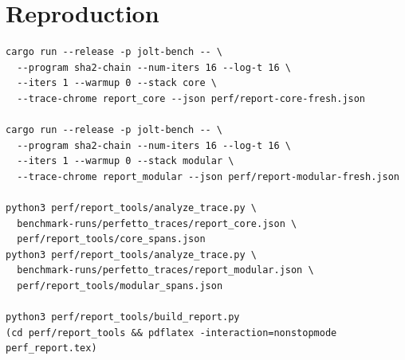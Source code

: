 \documentclass[10pt,a4paper]{article}
\begin{document}
\section{Reproduction}
\begin{verbatim}
cargo run --release -p jolt-bench -- \
  --program sha2-chain --num-iters 16 --log-t 16 \
  --iters 1 --warmup 0 --stack core \
  --trace-chrome report_core --json perf/report-core-fresh.json

cargo run --release -p jolt-bench -- \
  --program sha2-chain --num-iters 16 --log-t 16 \
  --iters 1 --warmup 0 --stack modular \
  --trace-chrome report_modular --json perf/report-modular-fresh.json

python3 perf/report_tools/analyze_trace.py \
  benchmark-runs/perfetto_traces/report_core.json \
  perf/report_tools/core_spans.json
python3 perf/report_tools/analyze_trace.py \
  benchmark-runs/perfetto_traces/report_modular.json \
  perf/report_tools/modular_spans.json

python3 perf/report_tools/build_report.py
(cd perf/report_tools && pdflatex -interaction=nonstopmode perf_report.tex)
\end{verbatim}
\end{document}
